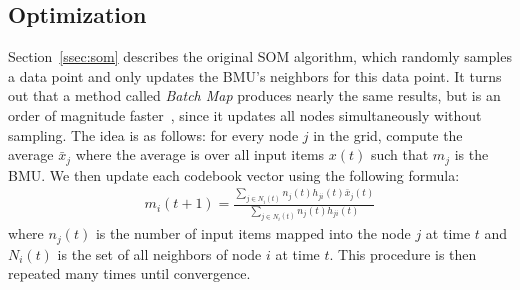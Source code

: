 \subsection{Optimization}\label{ssec:optimization}

Section~\ref{ssec:som} describes the original SOM algorithm, 
which randomly samples a data point and only updates the BMU's neighbors for this data point.
It turns out that a method called \emph{Batch Map} produces nearly the same results,
but is an order of magnitude faster~\cite{kohonen:2007}, 
since it updates all nodes simultaneously without sampling.
The idea is as follows: for every node $j$ in the grid, 
compute the average $\bar{x}_j$ where the average is over all input items $x(t)$ such that $m_j$ is the BMU. 
We then update each codebook vector using the following formula:
\begin{align*}
    m_i(t+1) = \frac{\sum\limits_{j \in N_i(t)} n_j(t) h_{ji}(t) \bar{x}_j(t)}{\sum\limits_{j \in N_i(t)} n_j(t) h_{ji}(t)}
\end{align*}
where $n_j(t)$ is the number of input items mapped into the node $j$ at time $t$
and $N_i(t)$ is the set of all neighbors of node $i$ at time $t$.
This procedure is then repeated many times until convergence.
